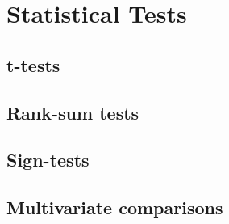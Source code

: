 \section{Statistical Tests}
\label{sec:StatisticalTests}

\subsection{t-tests}
\label{subsec:subasectionC}

\subsection{Rank-sum tests}
\label{subsec:subbsectionC}

\subsection{Sign-tests}
\label{subsec:subcsectionC}

\subsection{Multivariate comparisons}